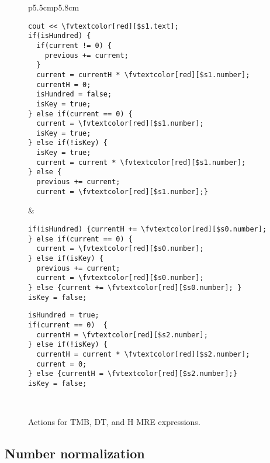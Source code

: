 \newcommand*{\fvtextcolor}[2]{\textcolor{#1}{#2}}
\begin{figure}[tb!]
\centering
  \begin{tabular}{p{5.5cm}p{5.8cm}}
\begin{Verbatim}[fontsize=\relsize{-1},frame=single,label=TMB algorithm,commandchars=\\\[\]] 
cout << \fvtextcolor[red][$s1.text];
if(isHundred) {
  if(current != 0) {
    previous += current;
  }
  current = currentH * \fvtextcolor[red][$s1.number];
  currentH = 0;
  isHundred = false;
  isKey = true;
} else if(current == 0) {
  current = \fvtextcolor[red][$s1.number];
  isKey = true;
} else if(!isKey) {
  isKey = true;
  current = current * \fvtextcolor[red][$s1.number];
} else {
  previous += current;
  current = \fvtextcolor[red][$s1.number];}
\end{Verbatim}
&
\begin{Verbatim}[fontsize=\relsize{-1},frame=single,label=DT algorithm,commandchars=\\\[\]] 
if(isHundred) {currentH += \fvtextcolor[red][$s0.number];
} else if(current == 0) {
  current = \fvtextcolor[red][$s0.number];
} else if(isKey) {
  previous += current;
  current = \fvtextcolor[red][$s0.number];
} else {current += \fvtextcolor[red][$s0.number]; }
isKey = false;
\end{Verbatim}
\begin{Verbatim}[fontsize=\relsize{-1},frame=single,label=H algorithm,commandchars=\\\[\]] 
isHundred = true;
if(current == 0)  {
  currentH = \fvtextcolor[red][$s2.number];
} else if(!isKey) {
  currentH = current * \fvtextcolor[red][$s2.number];
  current = 0;
} else {currentH = \fvtextcolor[red][$s2.number];}
isKey = false;
\end{Verbatim}
\\ 
\end{tabular}
  \vspace{-2em}
\caption{Actions for TMB, DT, and H MRE expressions.}
  \vspace{-1.5em}
\label{fig:numnormalgo}
\end{figure}

\vspace{-1em}
\subsection{Number normalization}
\label{subsec:numnorm}

